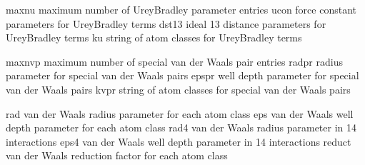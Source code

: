 \documentclass[letterpaper,11pt,english]{sphinxmanual}
\begin{document}
\sphinxAtStartPar
{}

\begin{sphinxVerbatim}[commandchars=\\\{\}]
maxnu           maximum number of Urey\PYGZhy{}Bradley parameter entries
ucon            force constant parameters for Urey\PYGZhy{}Bradley terms
dst13           ideal 1\PYGZhy{}3 distance parameters for Urey\PYGZhy{}Bradley terms
ku              string of atom classes for Urey\PYGZhy{}Bradley terms
\end{sphinxVerbatim}

\sphinxAtStartPar
{}

\begin{sphinxVerbatim}[commandchars=\\\{\}]
maxnvp          maximum number of special van der Waals pair entries
radpr           radius parameter for special van der Waals pairs
epspr           well depth parameter for special van der Waals pairs
kvpr            string of atom classes for special van der Waals pairs
\end{sphinxVerbatim}

\sphinxAtStartPar
{}

\begin{sphinxVerbatim}[commandchars=\\\{\}]
rad             van der Waals radius parameter for each atom class
eps             van der Waals well depth parameter for each atom class
rad4            van der Waals radius parameter in 1\PYGZhy{}4 interactions
eps4            van der Waals well depth parameter in 1\PYGZhy{}4 interactions
reduct          van der Waals reduction factor for each atom class
\end{sphinxVerbatim}

\sphinxAtStartPar
{}
\end{document}
